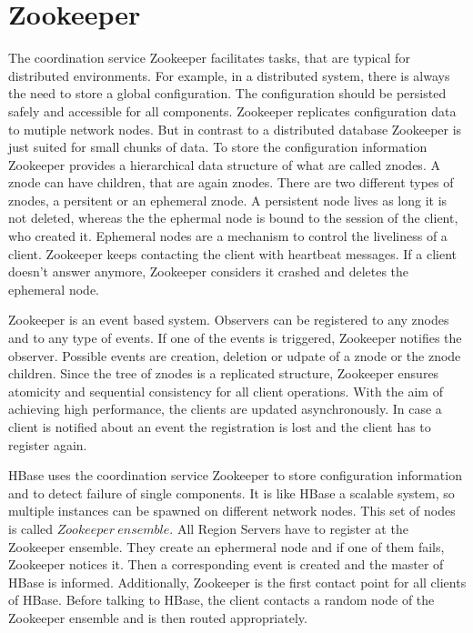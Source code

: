 \documentclass[11pt,a4paper,bibtotoc,idxtotoc,headsepline,footsepline,footexclude,BCOR12mm,DIV13]{scrbook}
\begin{document}
 

\section{Zookeeper}
\label{sec:zookeeper}
The coordination service Zookeeper facilitates tasks, that are typical for distributed environments. For example, in a distributed system, there is always the need to store a global configuration. The configuration should be persisted safely and accessible for all components. Zookeeper replicates configuration data to mutiple network nodes. But in contrast to a distributed database Zookeeper is just suited for small chunks of data. To store the configuration information Zookeeper provides a hierarchical data structure of what are called znodes. A znode can have children, that are again znodes. There are two different types of znodes, a persitent or an ephemeral znode. A persistent node lives as long it is not deleted, whereas the the ephermal node is bound to the session of the client, who created it. Ephemeral nodes are a mechanism to control the liveliness of a client. Zookeeper keeps contacting the client with heartbeat messages. If a client doesn't answer anymore, Zookeeper considers it crashed and deletes the ephemeral node.

Zookeeper is an event based system. Observers can be registered to any znodes and to any type of events. If one of the events is triggered, Zookeeper notifies the observer. Possible events are creation, deletion or udpate of a znode or the znode children. Since the tree of znodes is a replicated structure, Zookeeper ensures atomicity and sequential consistency for all client operations. With the aim of achieving high performance, the clients are updated asynchronously. In case a client is notified about an event the registration is lost and the client has to register again.

HBase uses the coordination service Zookeeper\cite{hunt:zookeeper} to store configuration information and to detect failure of single components. It is like HBase a scalable system, so multiple instances can be spawned on different network nodes. This set of nodes is called  $Zookeeper\:ensemble$. All Region Servers have to register at the Zookeeper ensemble. They create an ephermeral node and if one of them fails, Zookeeper notices it. Then a corresponding event is created and the master of HBase is informed. Additionally, Zookeeper is the first contact point for all clients of HBase. Before talking to HBase, the client contacts a random node of the Zookeeper ensemble and is then routed appropriately.
\end{document}
